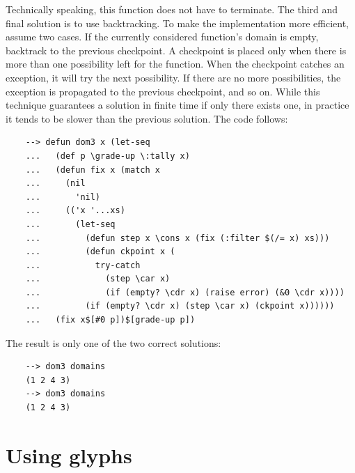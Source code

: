 Technically speaking, this function does not have to terminate. The third and final solution is to use backtracking. To make the implementation more efficient, assume two cases. If the currently considered function's domain is empty, backtrack to the previous checkpoint. A checkpoint is placed only when there is more than one possibility left for the function. When the checkpoint catches an exception, it will try the next possibility. If there are no more possibilities, the exception is propagated to the previous checkpoint, and so on. While this technique guarantees a solution in finite time if only there exists one, in practice it tends to be slower than the previous solution. The code follows:

\begin{Verbatim}
    --> defun dom3 x (let-seq
    ...   (def p \grade-up \:tally x)
    ...   (defun fix x (match x
    ...     (nil
    ...       'nil)
    ...     (('x '...xs)
    ...       (let-seq
    ...         (defun step x \cons x (fix (:filter $(/= x) xs)))
    ...         (defun ckpoint x (
    ...           try-catch
    ...             (step \car x)
    ...             (if (empty? \cdr x) (raise error) (&0 \cdr x))))
    ...         (if (empty? \cdr x) (step \car x) (ckpoint x))))))
    ...   (fix x$[#0 p])$[grade-up p])
\end{Verbatim}

The result is only one of the two correct solutions:

\begin{Verbatim}
    --> dom3 domains
    (1 2 4 3)
    --> dom3 domains
    (1 2 4 3)
\end{Verbatim}

\section{Using glyphs}

